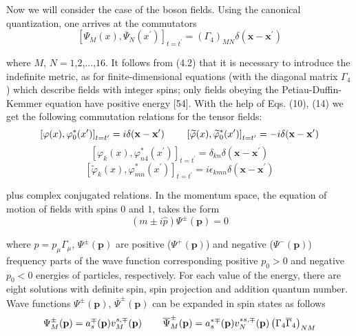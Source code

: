 \documentclass[a4paper,12pt]{article}
\begin{document}
Now we will consider the case of the boson fields. Using the canonical
quantization, one arrives at the commutators
\begin{equation}
\left[ \Psi _M(x),\overline{\Psi }_N(x^{\prime })\right] _{t=t^{\prime
}}=\left( \Gamma _4\right) _{MN}\delta (\mathbf{x}-\mathbf{x}^{\prime })
\label{64}
\end{equation}

where $M$, $N=1$,$2$,...,$16$. It follows from (4.2) that it is necessary to
introduce the indefinite metric, as for finite-dimensional equations (with
the diagonal matrix $\Gamma _4$) which describe fields with integer spins;
only fields obeying the Petiau-Duffin-Kemmer equation have positive energy
[54]. With the help of Eqs. (10), (14) we get the following commutation
relations for the tensor fields:
\[
\left[ \varphi (x),\varphi _0^{*}(x^{\prime })\right]
_{t=t^{\prime }}=i\delta (\mathbf{x}-\mathbf{x}^{\prime
})\hspace{0.3in}\left[ \widetilde{ \varphi }(x),\widetilde{\varphi
}_0^{*}(x^{\prime })\right] _{t=t^{\prime }}=-i\delta
(\mathbf{x}-\mathbf{x}^{\prime })
\]
\[
\left[ \varphi _k(x),\varphi _{n4}^{*}(x^{\prime })\right] _{t=t^{\prime
}}=\delta _{kn}\delta (\mathbf{x}-\mathbf{x}^{\prime })
\]
\begin{equation}
\left[ \widetilde{\varphi }_k(x),\varphi _{mn}^{*}(x^{\prime })\right]
_{t=t^{\prime }}=i\epsilon _{kmn}\delta (\mathbf{x}-\mathbf{x}^{\prime })
\label{65}
\end{equation}

plus complex conjugated relations. In the momentum space, the equation of
motion of fields with spins $0$ and $1$, takes the form
\begin{equation}
\left( m\pm i\widehat{p}\right) \Psi ^{\pm }(\mathbf{p})=0  \label{66}
\end{equation}

where $\widehat{p}=p_\mu \Gamma _\mu $, $\Psi ^{\pm }(\mathbf{p})$
are positive ($\Psi ^{+}(\mathbf{p})$) and negative ($\Psi
^{-}(\mathbf{p})$) frequency parts of the wave function
corresponding positive $p_0>0$ and negative $p_0<0$ energies of
particles, respectively. For each value of the energy, there are
eight solutions with definite spin, spin projection and addition
quantum number. Wave functions $\Psi ^{\pm }(\mathbf{p})$, $
\overline{\Psi }^{\pm }(\mathbf{p})$ can be expanded in spin
states as follows
\begin{equation}
\Psi _M^{\pm }(\mathbf{p})=a_s^{\mp }(\mathbf{p})v_M^{s,\mp
}(\mathbf{p}) \hspace{0.3in}\overline{\Psi }_M^{\pm
}(\mathbf{p})=a_s^{*\mp }(\mathbf{p} )v_N^{*s,\mp
}(\mathbf{p})\left( \Gamma _4\overline{\Gamma }_4\right) _{NM}
\label{67}
\end{equation}
\end{document}
